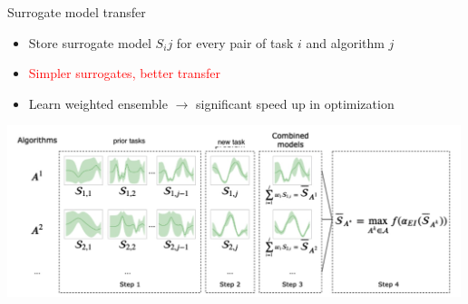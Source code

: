\begin{frame}{Surrogate model transfer}
    \begin{itemize}
        \item Store surrogate model $S_ij$ for every pair of task $i$ and algorithm $j$
        \item \textcolor{red}{Simpler surrogates, better transfer}
        \item Learn weighted ensemble $\rightarrow $ significant speed up in optimization
    \end{itemize}
\centering\includegraphics[height=5cm]{image/img203139.jpg}

\end{frame}

